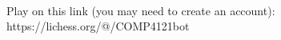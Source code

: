 \documentclass[a4paper,12pt]{report}
\begin{document}
\\ Play on this link (you may need to create an account):\\
https://lichess.org/@/COMP4121bot

\tableofcontents







\end{document}

